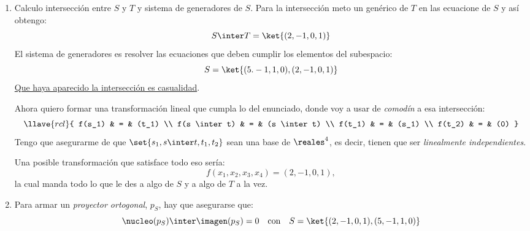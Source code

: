\begin{enumerate}[label=\alph*)]
  \item Calculo intersección entre $S$ y $T$ y sistema de generadores de $S$. Para la intersección meto un genérico de $T$ en las ecuacione de $S$ y así obtengo:
        $$
          S \inter T = \ket{(2,-1,0,1)}
        $$
        El sistema de generadores es resolver las ecuaciones que deben cumplir los elementos del subespacio:
        $$
          S =\ket{(5. -1, 1, 0), (2,-1,0,1)}
        $$
        \underline{Que haya aparecido la intersección es casualidad}.

        Ahora quiero formar una transformación lineal que cumpla lo del enunciado, donde voy a usar de \textit{comodín}
        a esa intersección:
        $$
          \llave{rcl}{
            f(s_1) & = & (t_1)  \\
            f(s \inter t) & = & (s \inter t) \\
            f(t_1) & = & (s_1) \\
            f(t_2) & = & (0)
          }
        $$
        Tengo que asegurarme de que $\set{s_1, s \inter t, t_1, t_2}$ sean una base de $\reales^4$, es decir,
        tienen que ser \textit{linealmente independientes}.

        Una posible transformación que satisface todo eso sería:
        $$
          f(x_1, x_2, x_3, x_4) = (2, -1, 0, 1),
        $$
        la cual manda todo lo que le des a algo de $S$ y a algo de $T$ a la vez.

  \item Para armar un \textit{proyector ortogonal}, $p_S$, hay que asegurarse que:
        $$
          \nucleo(p_S) \inter \imagen(p_S) = 0
          \quad \text{con} \quad
          S = \ket{(2,-1,0,1), (5,-1,1,0)}
        $$


\end{enumerate}
